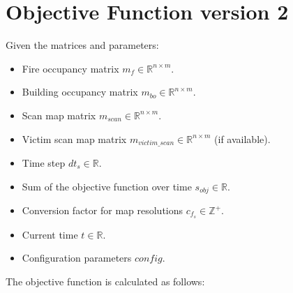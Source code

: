 \documentclass{article}
\begin{document}
\section*{Objective Function version 2}

Given the matrices and parameters:
\begin{itemize}
    \item Fire occupancy matrix $m_f \in \mathbb{R}^{n \times m}$.
    \item Building occupancy matrix $m_{bo} \in \mathbb{R}^{n \times m}$.
    \item Scan map matrix $m_{scan} \in \mathbb{R}^{n \times m}$.
    \item Victim scan map matrix $m_{victim\_scan} \in \mathbb{R}^{n \times m}$ (if available).
    \item Time step $dt_s \in \mathbb{R}$.
    \item Sum of the objective function over time $s_{obj} \in \mathbb{R}$.
    \item Conversion factor for map resolutions $c_{f_s} \in \mathbb{Z}^+$.
    \item Current time $t \in \mathbb{R}$.
    \item Configuration parameters $config$.
\end{itemize}

The objective function is calculated as follows:
\end{document}
